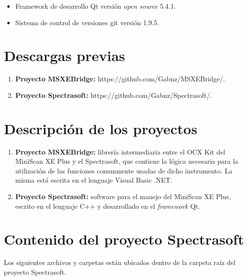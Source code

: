 	\begin{itemize}
	
		\item Framework de desarrollo Qt versi\'{o}n \textit{open source} 5.4.1.
		
		\item Sistema de control de versiones git versi\'{o}n 1.9.5.
	\end{itemize}

\section*{Descargas previas}

\begin{enumerate}
	\item \textbf{Proyecto MSXEBridge:} https://github.com/Gabnz/MSXEBridge/.
	
	\item \textbf{Proyecto Spectrasoft:} https://github.com/Gabnz/Spectrasoft/.
\end{enumerate}

\section*{Descripci\'{o}n de los proyectos}

\begin{enumerate}
	\item \textbf{Proyecto MSXEBridge:} librer\'{i}a intermediaria entre el OCX Kit del MiniScan XE Plus y el Spectrasoft, que contiene la l\'{o}gica necesaria para la utilizaci\'{o}n de las funciones comunmente usadas de dicho instrumento. La misma est\'{a} escrita en el lenguaje Visual Basic .NET.
	
	\item \textbf{Proyecto Spectrasoft:} software para el manejo del MiniScan XE Plus, escrito en el lenguaje C++ y desarrollado en el \textit{framework} Qt.
\end{enumerate}

\section*{Contenido del proyecto Spectrasoft}

Los siguientes archivos y carpetas est\'{a}n ubicados dentro de la carpeta ra\'{i}z del proyecto Spectrasoft.


